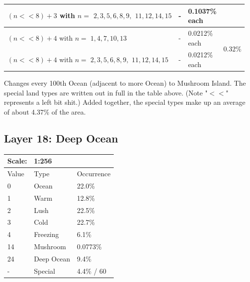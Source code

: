 \documentclass{article}
\begin{document}
\begin{tabular}{|l|l|l|l|}
		\makecell[l]{ $(n<<8)+3$ \\ with $n = $ \\ $2, 3, 5, 6, 8, 9,$ \\ $11, 12, 14, 15$ } & - &
		\makecell[l]{0.1037\% \\ each} & \\\hline\hline

		\makecell[l]{ $(n<<8)+4$ \\ with $n = $ \\ $1, 4, 7, 10, 13$ } & - &
		\makecell[l]{0.0212\% \\ each} & \multirow{5}{*}{0.32\%}\\\cline{1-3}

		\makecell[l]{ $(n<<8)+4$ \\ with $n = $ \\ $2, 3, 5, 6, 8, 9,$ \\ $11, 12, 14, 15$ } & - &
		\makecell[l]{0.0212\% \\ each} & \\\hline

	\end{tabular}

	\medskip\noindent
	Changes every 100th Ocean (adjacent to more Ocean) to Mushroom Island. The special land types are written out in full in the table above. (Note "$<<$" represents a left bit shit.) Added together, the special types make up an average of about 4.37\% of the area.


	\subsection{Layer 18: Deep Ocean}
	\begin{tabular}{|l|l|l|}\hline
		Scale: & \multicolumn{2}{|l|}{1:256} \\\hline\hline
		Value  & Type       & Occurrence \\\hline
		0      & Ocean      & 22.0\%\\\hline
		1      & Warm       & 12.8\%\\\hline
		2      & Lush       & 22.5\%\\\hline
		3      & Cold       & 22.7\%\\\hline
		4      & Freezing   & 6.1\%\\\hline
		14     & Mushroom   & 0.0773\%\\\hline
		24     & Deep Ocean & 9.4\%\\\hline
		-      & Special    & 4.4\% / 60\\\hline
	\end{tabular}
\end{document}
